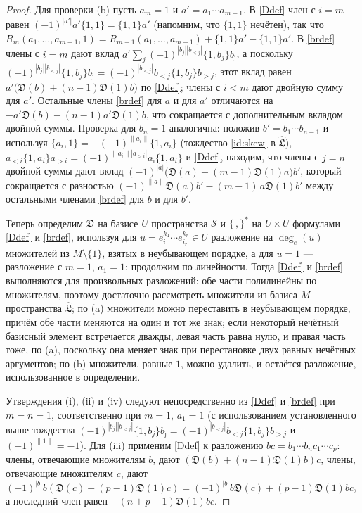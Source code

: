 \documentclass[11pt,reqno]{amsart}
\newcommand{\LL}{\mathfrak L}
\newcommand{\D}{\mathfrak D}
\newcommand{\Sm}{\mathcal S}
\newcommand{\Lh}{\widehat{\LL}}
\newcommand{\rp}[1]{\|#1\|}
\theoremstyle{plain}
\theoremstyle{definition}
\theoremstyle{remark}
\begin{document}
\begin{proof}
Для проверки (b) пусть $a_m=1$ и $a'=a_1\cdots a_{m-1}$.
В \eqref{Ddef} член с $i=m$ равен $(-1)^{|a'|}a'\{1,1\}=\{1,1\}a'$ (напомним, что $\{1,1\}$ нечётен), так что $R_m(a_1,\dots,a_{m-1},1)=R_{m-1}(a_1,\dots,a_{m-1})+\{1,1\}a'-\{1,1\}a'$.
В \eqref{brdef} члены с $i=m$ дают вклад $a'\sum_{j}(-1)^{|b_j||b_{<j}|}\{1,b_j\}b_{\hat\jmath}$, а поскольку $(-1)^{|b_j||b_{<j}|}\{1,b_j\}b_{\hat\jmath}=(-1)^{|b_{<j}|}b_{<j}\{1,b_j\}b_{>j}$, этот вклад равен $a'\bigl(\D(b)+(n-1)\D(1)b\bigr)$ по \eqref{Ddef}; члены с $i<m$ дают двойную сумму для $a'$.
Остальные члены \eqref{brdef} для $a$ и для $a'$ отличаются на $-a'\D(b)-(n-1)a'\D(1)b$, что сокращается с дополнительным вкладом двойной суммы.
Проверка для $b_n=1$ аналогична: положив $b'=b_1\cdots b_{n-1}$ и используя $\{a_i,1\}=-(-1)^{\rp{a_i}}\{1,a_i\}$ (тождество \eqref{id:skew} в $\Lh$), $a_{<i}\{1,a_i\}a_{>i}=(-1)^{\rp{a_i}|a_{>i}|}a_{\hat\imath}\{1,a_i\}$ и \eqref{Ddef}, находим, что члены с $j=n$ двойной суммы дают вклад $(-1)^{|a|}\bigl(\D(a)+(m-1)\D(1)a\bigr)b'$, который сокращается с разностью $(-1)^{\rp a}\D(a)b'-(m-1)\,a\D(1)b'$ между остальными членами \eqref{brdef} для $b$ и для $b'$.

Теперь определим $\D$ на базисе $U$ пространства $\Sm$ и $\{\,,\}^*$ на $U\times U$ формулами \eqref{Ddef} и \eqref{brdef}, используя для $u=e_{i_1}^{k_1}\cdots e_{i_r}^{k_r}\in U$ разложение на $\deg_e(u)$ множителей из $M\setminus\{1\}$, взятых в неубывающем порядке, а для $u=1$ --- разложение с $m=1$, $a_1=1$; продолжим по линейности.
Тогда \eqref{Ddef} и \eqref{brdef} выполняются для произвольных разложений: обе части полилинейны по множителям, поэтому достаточно рассмотреть множители из базиса $M$ пространства $\Lh$; по (a) множители можно переставить в неубывающем порядке, причём обе части меняются на один и тот же знак; если некоторый нечётный базисный элемент встречается дважды, левая часть равна нулю, и правая часть тоже, по (a), поскольку она меняет знак при перестановке двух равных нечётных аргументов; по (b) множители, равные $1$, можно удалить, и остаётся разложение, использованное в определении.

Утверждения (i), (ii) и (iv) следуют непосредственно из \eqref{Ddef} и \eqref{brdef} при $m=n=1$, соответственно при $m=1$, $a_1=1$ (с использованием установленного выше тождества $(-1)^{|b_j||b_{<j}|}\{1,b_j\}b_{\hat\jmath}=(-1)^{|b_{<j}|}b_{<j}\{1,b_j\}b_{>j}$ и $(-1)^{\rp 1}=-1$).
Для (iii) применим \eqref{Ddef} к разложению $bc=b_1\cdots b_nc_1\cdots c_p$: члены, отвечающие множителям $b$, дают $(\D(b)+(n-1)\D(1)b)c$, члены, отвечающие множителям $c$, дают $(-1)^{|b|}b(\D(c)+(p-1)\D(1)c)=(-1)^{|b|}b\D(c)+(p-1)\D(1)bc$, а последний член равен $-(n+p-1)\D(1)bc$.
\end{proof}
\end{document}

